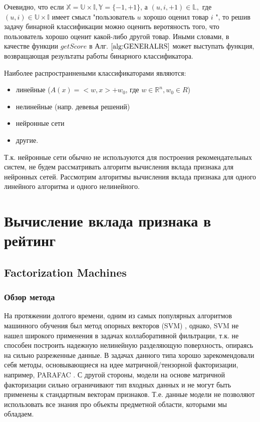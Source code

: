 \documentclass[12pt,a4paper]{report}
\begin{document}
Очевидно, что если $\mathbb{X} = \mathbb{U} \times \mathbb{I}, \mathbb{Y} = \{-1, +1\}$, а
 $(u, i, +1) \in \mathbb{L},$ где $(u, i) \in \mathbb{U} \times \mathbb{I}$ имеет смысл "пользователь $u$ хорошо оценил товар $i$ ", то решив задачу бинарной классификации можно оценить веротяность того, что пользователь хорошо оценит какой-либо другой товар. Иными словами, в качестве функции $getScore$ в Алг. $\ref{alg:GENERALRS}$ может выступать функция, возвращающая результаты работы бинарного классификатора.

Наиболее распространнеными классификаторами являются:
\begin{itemize}
\item линейные ($A(x) = <w, x> + w_0$, где $w \in \mathbb{R}^n, w_0 \in R$)
\item нелинейные (напр. девевья решений)
\item нейронные сети
\item другие.
\end{itemize}

Т.к. нейронные сети обычно не используются для построения рекомендательных систем, не будем рассматривать алгоритм вычисления вклада признака для нейронных сетей. Рассмотрим алгоритмы вычисления вклада признака для одного линейного алгоритма и одного нелинейного.
\section{Вычисление вклада признака в рейтинг}
\subsection{Factorization Machines}
\subsubsection{Обзор метода}
На протяжении долгого времени, одним из самых популярных алгоритмов машинного обучения был метод опорных векторов (SVM) \cite{Svm} , однако, SVM не нашел широкого применения в задачах коллаборативной фильтрации, т.к. не способен построить надежную нелинейную разделяющую поверхность, опираясь на сильно разреженные данные. В задачах данного типа хорошо зарекомендовали себя методы, основывающиеся на идее матричной/тензорной факторизации, например, PARAFAC \cite{Parafac}. С другой стороны, модели на основе матричной факторизации сильно ограничивают тип входных данных и не могут быть применены к стандартным векторам признаков. Т.е. данные модели не позволяют использовать все знания про объекты предметной области, которыми мы обладаем.
\end{document}
